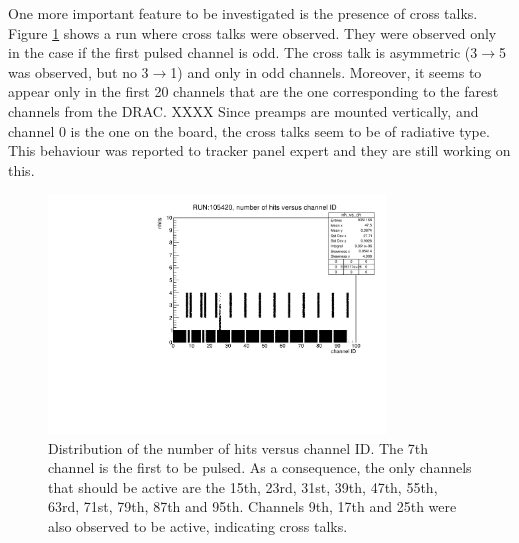 One more important feature to be investigated is the presence of cross talks. Figure \ref{fig:cross} shows a run where cross talks were observed.
They were observed only in the case if the first pulsed channel is odd. The cross talk is asymmetric (3$\rightarrow$5 was observed, 
but no 3$\rightarrow$1) and only in odd channels.
Moreover, it seems to appear only in the first 20 channels that are the one corresponding to the farest channels from the DRAC. XXXX
Since preamps are mounted vertically, and channel 0 is the one on the board, the cross talks seem to be of radiative type.
This behaviour was reported to tracker panel expert and they are still working on this.
\begin{figure}[!h]
  \centering
  \includegraphics[width=0.8\textwidth]{figures/pdf/run105420_nh_vs_ch.pdf}
  \caption{Distribution of the number of hits versus channel ID. The 7th channel is the first to be pulsed. 
  As a consequence, the only channels that should be active are the 15th, 23rd, 31st, 39th, 47th, 55th, 63rd, 71st, 79th, 87th and 95th. 
  Channels 9th, 17th and 25th were also observed to be active, indicating cross talks.}
 \label{fig:cross}
\end{figure}
